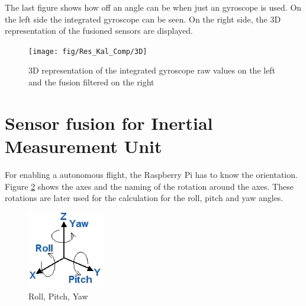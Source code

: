 The last figure shows how off an angle can be when just an gyroscope is used. On the left side the integrated gyroscope can be seen. On the right side, the 3D representation of the fusioned sensors are displayed.
\begin{figure}[H]
	\centering\texttt{[image: fig/Res\_Kal\_Comp/3D]}
	\caption[3D representation of Kalman-filtered IMU-Data in MATLAB]{3D representation of the integrated gyroscope raw values on the left and the fusion filtered on the right}
	\label{fig:KalmanFilterResult:3D}
\end{figure}

\newpage
\section{Sensor fusion for Inertial Measurement Unit}
\label{sec:Sensor fusion for Inertial Measurement Unit}


For enabling a autonomous flight, the Raspberry Pi has to know the orientation. Figure \ref{fig:angles} shows the axes and the naming of the rotation around the axes. These rotations are later used for the calculation for the roll, pitch and yaw angles.

\begin{figure}[H]
	\centering\includegraphics[width=0.3\textwidth]{fig/Kal_Comp/Roll_pitch_yaw}
	\caption{Roll, Pitch, Yaw \cite{doc:boreg}}
	\label{fig:angles}
\end{figure}

